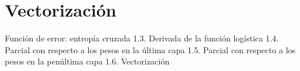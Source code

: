 \section{Vectorización}
Función de error: entropía cruzada
1.3. Derivada de la función logística
1.4. Parcial con respecto a los pesos en la última capa
1.5. Parcial con respecto a los pesos en la penúltima capa
1.6. Vectorización
